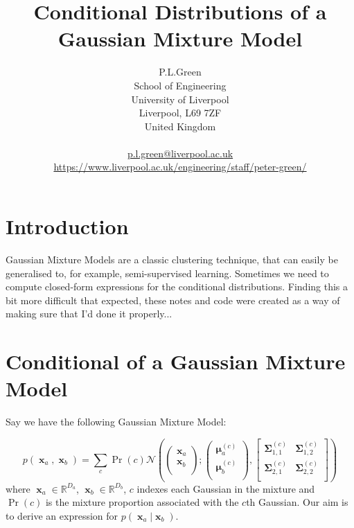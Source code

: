 \documentclass[a4paper, 11pt]{article}
\DeclareMathOperator{\x}{\boldsymbol{x}}
\DeclareMathOperator{\bmu}{\boldsymbol{\mu}}
\DeclareMathOperator{\bSigma}{\boldsymbol{\Sigma}}
\begin{document}
\title{Conditional Distributions of a Gaussian Mixture Model}
\author{P.L.Green\\
School of Engineering\\
University of Liverpool\\
Liverpool, L69 7ZF\\
United Kingdom\\
\\
\href{mailto:p.l.green@liverpool.ac.uk}{p.l.green@liverpool.ac.uk} \\
\url{https://www.liverpool.ac.uk/engineering/staff/peter-green/}
}
\maketitle

\section{Introduction}
Gaussian Mixture Models are a classic clustering technique, that can easily be generalised to, for example, semi-supervised learning. Sometimes we need to compute closed-form expressions for the conditional distributions. Finding this a bit more difficult that expected, these notes and code were created as a way of making sure that I'd done it properly...  

\section{Conditional of a Gaussian Mixture Model}
Say we have the following Gaussian Mixture Model:

\begin{equation}
	p(\x_a, \x_b) = 
    \sum_c \Pr(c)
    \mathcal{N}\left(
		\left(
		\begin{array}{c}
			\x_a \\
			\x_b \\
		\end{array}
		\right);
		\left(
		\begin{array}{c}
			\bmu_a^{(c)} \\
			\bmu_b^{(c)} \\
		\end{array}
		\right),
		\left[
		\begin{array}{cc}
			\bSigma_{1,1}^{(c)} & \bSigma_{1,2}^{(c)} \\
			\bSigma_{2,1}^{(c)} & \bSigma_{2,2}^{(c)} \\
		\end{array}
		\right]
	\right)
\end{equation}
where $\x_a \in \mathbb{R}^{D_a}$, $\x_b \in \mathbb{R}^{D_b}$, $c$ indexes each Gaussian in the mixture and $\Pr(c)$ is the mixture proportion associated with the $c$th Gaussian. Our aim is to derive an expression for $p(\x_a | \x_b)$. \\
\end{document}
